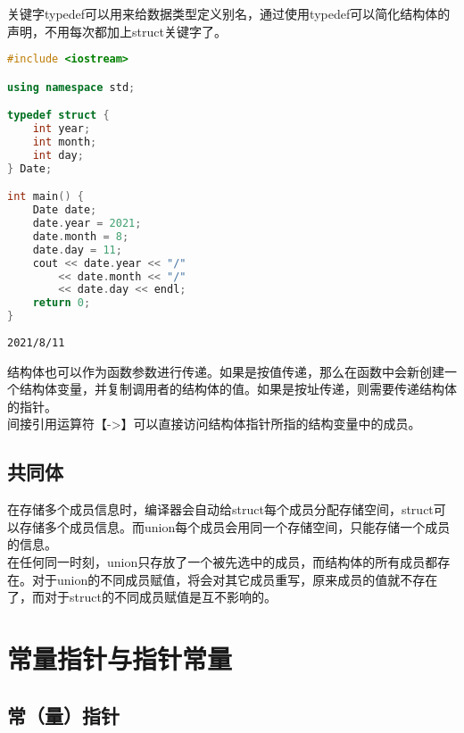 关键字typedef可以用来给数据类型定义别名，通过使用typedef可以简化结构体的声明，不用每次都加上struct关键字了。\\


\begin{lstlisting}[language=C++]
#include <iostream>

using namespace std;

typedef struct {
    int year;
    int month;
    int day;
} Date;

int main() {
    Date date;
    date.year = 2021;
    date.month = 8;
    date.day = 11;
    cout << date.year << "/"
        << date.month << "/"
        << date.day << endl;
    return 0;
}
\end{lstlisting}

\begin{tcolorbox}
	\begin{verbatim}
2021/8/11
	\end{verbatim}
\end{tcolorbox}

结构体也可以作为函数参数进行传递。如果是按值传递，那么在函数中会新创建一个结构体变量，并复制调用者的结构体的值。如果是按址传递，则需要传递结构体的指针。\\

间接引用运算符【->】可以直接访问结构体指针所指的结构变量中的成员。\\

\subsection{共同体}

在存储多个成员信息时，编译器会自动给struct每个成员分配存储空间，struct可以存储多个成员信息。而union每个成员会用同一个存储空间，只能存储一个成员的信息。\\

在任何同一时刻，union只存放了一个被先选中的成员，而结构体的所有成员都存在。对于union的不同成员赋值，将会对其它成员重写，原来成员的值就不存在了，而对于struct的不同成员赋值是互不影响的。\\

\newpage

\section{常量指针与指针常量}

\subsection{常（量）指针}

